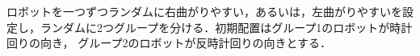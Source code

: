 ロボットを一つずつランダムに右曲がりやすい，あるいは，左曲がりやすいを設定し，ランダムに2つグループを分ける．初期配置はグループ1のロボットが時計回りの向き，
グループ2のロボットが反時計回りの向きとする．



